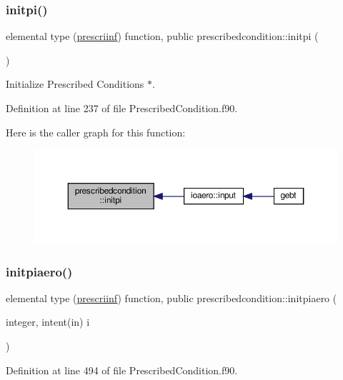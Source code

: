 \subsubsection{\texorpdfstring{initpi()}{initpi()}}
{\footnotesize\ttfamily elemental type (\hyperlink{structprescribedcondition_1_1prescriinf}{prescriinf}) function, public prescribedcondition\+::initpi (\begin{DoxyParamCaption}{ }\end{DoxyParamCaption})}



Initialize Prescribed Conditions $\ast$. 



Definition at line 237 of file Prescribed\+Condition.\+f90.

Here is the caller graph for this function\+:\nopagebreak
\begin{figure}[H]
\begin{center}
\leavevmode
\includegraphics[width=350pt]{namespaceprescribedcondition_ae3bccf07eaf4452047a11ce8dcb3e554_icgraph}
\end{center}
\end{figure}
\mbox{\label{namespaceprescribedcondition_a29eb27f666876bff8a4577eb21d5b2d1}} 
\subsubsection{\texorpdfstring{initpiaero()}{initpiaero()}}
{\footnotesize\ttfamily elemental type (\hyperlink{structprescribedcondition_1_1prescriinf}{prescriinf}) function, public prescribedcondition\+::initpiaero (\begin{DoxyParamCaption}\item[{integer, intent(in)}]{i }\end{DoxyParamCaption})}



Definition at line 494 of file Prescribed\+Condition.\+f90.

